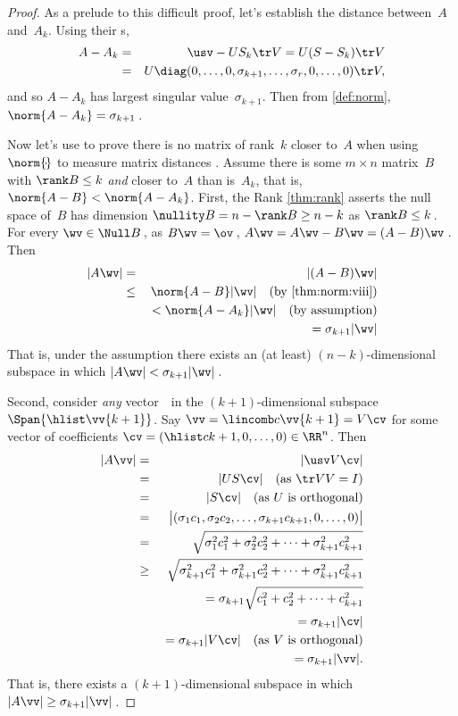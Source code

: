 \begin{proof} 
As a prelude to this difficult proof, let's establish the distance between~\(A\) and~\(A_k\). 
Using their \svd{}s,
\begin{eqnarray*}
A-A_k&=&\usv-US_k\tr V=U(S-S_k)\tr V
\\&=&U\diag(0,\ldots,0,\sigma_{k+1},\ldots,\sigma_r,0,\ldots,0)\tr V,
\end{eqnarray*}
and so \(A-A_k\) has largest singular value~\(\sigma_{k+1}\).
Then from \autoref{def:norm}, \(\norm{A-A_k}=\sigma_{k+1}\)\,.

Now let's use  to prove there is no matrix of rank~\(k\) closer to~\(A\) when using \(\norm{\cdot}\) to measure matrix distances \cite[p.36]{Trefethen1997}.
Assume there is some \(m\times n\) matrix~\(B\) with \(\rank B\leq k\) \emph{and}  closer to~\(A\) than is~\(A_k\), that is, \(\norm{A-B}<\norm{A-A_k}\).
First, the Rank \autoref{thm:rank} asserts the null space of~\(B\) has dimension \(\nullity B =n-\rank B\geq n-k\) as  \(\rank B\leq k\)\,.
For every \(\wv\in\Null B\)\,,  as \(B\wv=\ov\)\,,  \(A\wv=A\wv-B\wv=(A-B)\wv\)\,. 
Then
\begin{eqnarray*}
|A\wv|&=&|(A-B)\wv|
\\&\leq&\norm{A-B}|\wv| 
\quad(\text{by \autoref{thm:norm:viii}})
\\&&{}<\norm{A-A_k}|\wv|
\quad(\text{by assumption})
\\&&\phantom{{}<}{}=\sigma_{k+1}|\wv|
\end{eqnarray*}
That is, under the assumption there exists an (at least) \((n-k)\)-dimensional subspace in which \(|A\wv|<\sigma_{k+1}|\wv|\)\,.

Second, consider \emph{any} vector~\vv\ in the \((k+1)\)-dimensional subspace \(\Span\{\hlist\vv{k+1}\}\).
Say \(\vv=\lincomb c\vv{k+1}=V\cv\) for some vector of coefficients \(\cv=(\hlist c{k+1},0,\ldots,0)\in\RR^n\).
Then
\begin{eqnarray*}
|A\vv|&=&|\usv V\cv|
\\&=&|US\cv| \quad(\text{as }\tr VV=I)
\\&=&|S\cv| \quad(\text{as \(U\) is orthogonal})
\\&=&\big|(\sigma_1c_1,\sigma_2c_2,\ldots,\sigma_{k+1}c_{k+1},0,\ldots,0)\big|
\\&=&\sqrt{\sigma_1^2c_1^2+\sigma_2^2c_2^2+\cdots+\sigma_{k+1}^2c_{k+1}^2}
\\&\geq&\sqrt{\sigma_{k+1}^2c_1^2+\sigma_{k+1}^2c_2^2+\cdots+\sigma_{k+1}^2c_{k+1}^2}
\\&&{}=\sigma_{k+1}\sqrt{c_1^2+c_2^2+\cdots+c_{k+1}^2}
\\&&{}=\sigma_{k+1}|\cv|
\\&&{}=\sigma_{k+1}|V\cv|\quad(\text{as \(V\) is orthogonal})
\\&&{}=\sigma_{k+1}|\vv|.
\end{eqnarray*}
That is, there exists a \((k+1)\)-dimensional subspace in which \(|A\vv|\geq\sigma_{k+1}|\vv|\)\,.


\end{proof}

